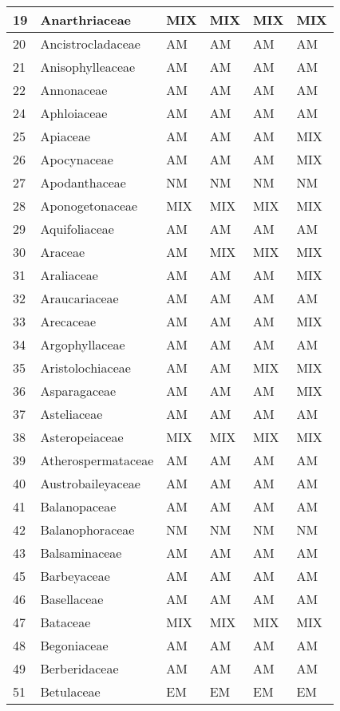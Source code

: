 \documentclass[]{article}
\begin{document}
\begin{longtable}{l|l|l|l|l|l}
\hline
19 & Anarthriaceae & MIX & MIX & MIX & MIX\\
\hline
20 & Ancistrocladaceae & AM & AM & AM & AM\\
\hline
21 & Anisophylleaceae & AM & AM & AM & AM\\
\hline
22 & Annonaceae & AM & AM & AM & AM\\
\hline
24 & Aphloiaceae & AM & AM & AM & AM\\
\hline
25 & Apiaceae & AM & AM & AM & MIX\\
\hline
26 & Apocynaceae & AM & AM & AM & MIX\\
\hline
27 & Apodanthaceae & NM & NM & NM & NM\\
\hline
28 & Aponogetonaceae & MIX & MIX & MIX & MIX\\
\hline
29 & Aquifoliaceae & AM & AM & AM & AM\\
\hline
30 & Araceae & AM & MIX & MIX & MIX\\
\hline
31 & Araliaceae & AM & AM & AM & MIX\\
\hline
32 & Araucariaceae & AM & AM & AM & AM\\
\hline
33 & Arecaceae & AM & AM & AM & MIX\\
\hline
34 & Argophyllaceae & AM & AM & AM & AM\\
\hline
35 & Aristolochiaceae & AM & AM & MIX & MIX\\
\hline
36 & Asparagaceae & AM & AM & AM & MIX\\
\hline
37 & Asteliaceae & AM & AM & AM & AM\\
\hline
38 & Asteropeiaceae & MIX & MIX & MIX & MIX\\
\hline
39 & Atherospermataceae & AM & AM & AM & AM\\
\hline
40 & Austrobaileyaceae & AM & AM & AM & AM\\
\hline
41 & Balanopaceae & AM & AM & AM & AM\\
\hline
42 & Balanophoraceae & NM & NM & NM & NM\\
\hline
43 & Balsaminaceae & AM & AM & AM & AM\\
\hline
45 & Barbeyaceae & AM & AM & AM & AM\\
\hline
46 & Basellaceae & AM & AM & AM & AM\\
\hline
47 & Bataceae & MIX & MIX & MIX & MIX\\
\hline
48 & Begoniaceae & AM & AM & AM & AM\\
\hline
49 & Berberidaceae & AM & AM & AM & AM\\
\hline
51 & Betulaceae & EM & EM & EM & EM\\

\end{longtable}
\end{document}
